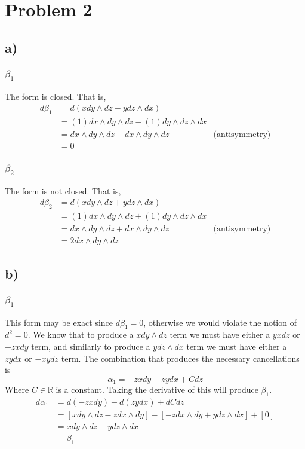 \documentclass{article}
\theoremstyle{definition}
\begin{document}
\section*{Problem 2}
\subsection*{a)}
\subsubsection*{$\beta_1$}
The form is closed. That is,
\begin{align*}
    d\beta_1 &= d(xdy \wedge dz - y dz \wedge dx) \\
    &= (1)dx \wedge dy \wedge dz - (1)dy \wedge dz \wedge dx \\
    &= dx \wedge dy \wedge dz - dx \wedge dy \wedge dz & \text{(antisymmetry)} \\
    &= 0
\end{align*}
\subsubsection*{$\beta_2$}
The form is not closed. That is,
\begin{align*}
    d\beta_2 &= d(xdy \wedge dz + y dz \wedge dx) \\
    &= (1)dx \wedge dy \wedge dz + (1)dy \wedge dz \wedge dx \\
    &= dx \wedge dy \wedge dz + dx \wedge dy \wedge dz & \text{(antisymmetry)} \\
    &= 2 dx \wedge dy \wedge dz
\end{align*}
\subsection*{b)}
\subsubsection*{$\beta_1$}
This form may be exact since $d \beta_1 = 0$, otherwise we would violate the notion of $d^2 = 0$.
We know that to produce a $xdy \wedge dz$ term we must have either a $yxdz$ or $-zxdy$ term, and similarly
to produce a $ydz \wedge dx$ term we must have either a $zydx$ or $-xydz$ term. The combination that produces
the necessary cancellations is
\[
\alpha_1 = -zxdy - zydx + C dz
\]
Where $C \in \mathbb{R}$ is a constant. Taking the derivative of this will produce $\beta_1$.
\begin{align*}
    d \alpha_1 &= d(-zxdy) - d(zydx) + dCdz \\
    &= [xdy \wedge dz - z dx \wedge dy] - [-zdx \wedge dy + y dz \wedge dx] + [0] \\
    &= xdy\wedge dz - ydz \wedge dx\\
    &= \beta_1
\end{align*}
\end{document}
